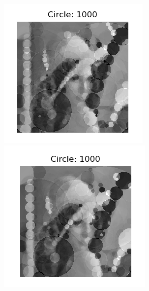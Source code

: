 \documentclass[12pt]{article}
\begin{document}
\begin{figure}[H]
\noindent\includegraphics[width=\textwidth/6]{../results/lenna/lenna_pop28}
\noindent\includegraphics[width=\textwidth/6]{../results/lenna/lenna_pop35}

\end{figure}
\end{document}
